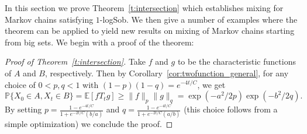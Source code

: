 \documentclass[11pt]{amsart}
\newcommand{\E}{\mathbb{E}}
\newcommand{\PP}{\mathbb{P}}
\newcommand{\eps}{\epsilon}
\newcommand{\1}{\mathbf{1}}
\def\E{{\mathbb E}}
\theoremstyle{definition}
\theoremstyle{plain}
\theoremstyle{remark}
\numberwithin{equation}{section}
\begin{document}
In this section we prove Theorem~\ref{t:intersection} which establishes mixing for Markov chains satisfying $1$-logSob.
We then give a number of examples where the theorem can be applied to yield new results on mixing of Markov chains starting from big sets.
We begin with a proof of the theorem:

\begin{proof}[Proof of Theorem~\ref{t:intersection}]
Take $f$ and $g$ to be the characteristic functions of $A$
and $B$, respectively.  Then by
Corollary~\ref{cor:twofunction_general}, for any choice of $0< p,
q < 1$ with $(1-p)(1-q) = e^{-4t/C}$, we get
\begin{equation}
\PP\{ X_0 \in A, X_t \in B \} = \E [f T_t g]  \geq \|f\|_p \|g\|_q = \exp(-a^2/2p) \exp(-b^2/2q).
\label{eqn:iso}
\end{equation}
By setting $p=\frac{1- e^{-4t/C} }{1+ e^{-2t/C} (b/a)}$ and $q=\frac{1- e^{-4t/C} }{1+ e^{-2t/C} (a/b)}$ (this choice follows from a simple optimization) we conclude the proof.
\end{proof}

\end{document}
